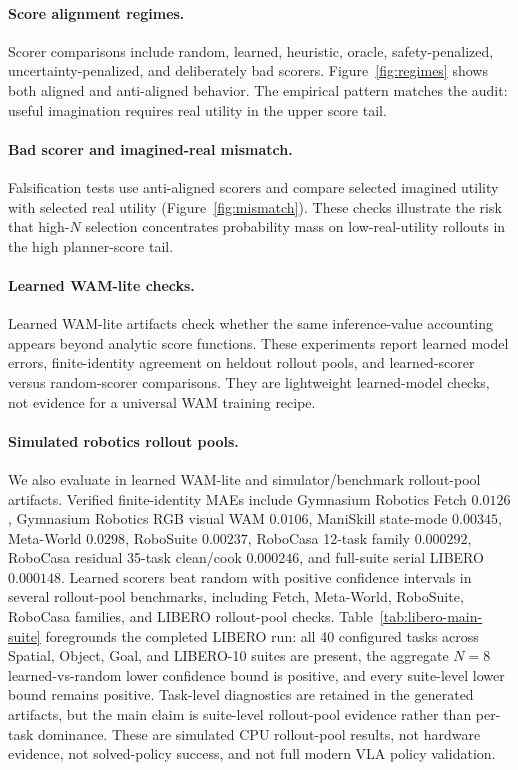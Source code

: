 \documentclass{article}
\begin{document}
\paragraph{Score alignment regimes.}
Scorer comparisons include random, learned, heuristic, oracle, safety-penalized, uncertainty-penalized, and deliberately bad scorers. Figure~\ref{fig:regimes} shows both aligned and anti-aligned behavior. The empirical pattern matches the audit: useful imagination requires real utility in the upper score tail.

\paragraph{Bad scorer and imagined-real mismatch.}
Falsification tests use anti-aligned scorers and compare selected imagined utility with selected real utility (Figure~\ref{fig:mismatch}). These checks illustrate the risk that high-$N$ selection concentrates probability mass on low-real-utility rollouts in the high planner-score tail.

\paragraph{Learned WAM-lite checks.}
Learned WAM-lite artifacts check whether the same inference-value accounting appears beyond analytic score functions. These experiments report learned model errors, finite-identity agreement on heldout rollout pools, and learned-scorer versus random-scorer comparisons. They are lightweight learned-model checks, not evidence for a universal WAM training recipe.

\paragraph{Simulated robotics rollout pools.}
We also evaluate in learned WAM-lite and simulator/benchmark rollout-pool artifacts. Verified finite-identity MAEs include Gymnasium Robotics Fetch $0.0126$, Gymnasium Robotics RGB visual WAM $0.0106$, ManiSkill state-mode $0.00345$, Meta-World $0.0298$, RoboSuite $0.00237$, RoboCasa 12-task family $0.000292$, RoboCasa residual 35-task clean/cook $0.000246$, and full-suite serial LIBERO $0.000148$. Learned scorers beat random with positive confidence intervals in several rollout-pool benchmarks, including Fetch, Meta-World, RoboSuite, RoboCasa families, and LIBERO rollout-pool checks. Table~\ref{tab:libero-main-suite} foregrounds the completed LIBERO run: all 40 configured tasks across Spatial, Object, Goal, and LIBERO-10 suites are present, the aggregate $N=8$ learned-vs-random lower confidence bound is positive, and every suite-level lower bound remains positive. Task-level diagnostics are retained in the generated artifacts, but the main claim is suite-level rollout-pool evidence rather than per-task dominance. These are simulated CPU rollout-pool results, not hardware evidence, not solved-policy success, and not full modern VLA policy validation.
\end{document}
